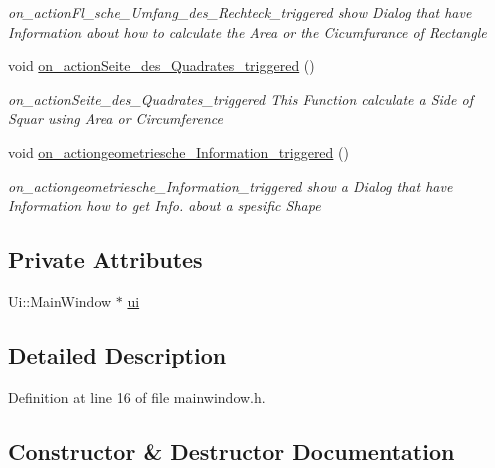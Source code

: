 \begin{DoxyCompactItemize}
\begin{DoxyCompactList}\small\item\em on\+\_\+action\+Fl\+\_\+sche\+\_\+\+Umfang\+\_\+des\+\_\+\+Rechteck\+\_\+triggered show Dialog that have Information about how to calculate the Area or the Cicumfurance of Rectangle \end{DoxyCompactList}\item 
void \mbox{\hyperlink{class_main_window_afb97ac9d597cbe05644fca0581c4d234}{on\+\_\+action\+Seite\+\_\+des\+\_\+\+Quadrates\+\_\+triggered}} ()
\begin{DoxyCompactList}\small\item\em on\+\_\+action\+Seite\+\_\+des\+\_\+\+Quadrates\+\_\+triggered This Function calculate a Side of Squar using Area or Circumference \end{DoxyCompactList}\item 
void \mbox{\hyperlink{class_main_window_a0aaf788d95e063d7320924549ded59aa}{on\+\_\+actiongeometriesche\+\_\+\+Information\+\_\+triggered}} ()
\begin{DoxyCompactList}\small\item\em on\+\_\+actiongeometriesche\+\_\+\+Information\+\_\+triggered show a Dialog that have Information how to get Info. about a spesific Shape \end{DoxyCompactList}\end{DoxyCompactItemize}
\subsection*{Private Attributes}
\begin{DoxyCompactItemize}
\item 
Ui\+::\+Main\+Window $\ast$ \mbox{\hyperlink{class_main_window_a35466a70ed47252a0191168126a352a5}{ui}}
\end{DoxyCompactItemize}


\subsection{Detailed Description}


Definition at line 16 of file mainwindow.\+h.



\subsection{Constructor \& Destructor Documentation}
\mbox{\label{class_main_window_a996c5a2b6f77944776856f08ec30858d}} 

